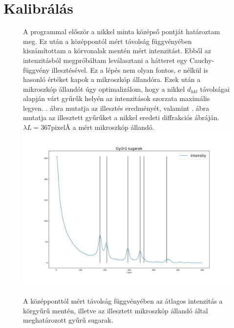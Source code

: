 \documentclass[pdftex,12pt,a4paper]{article}
\begin{document}
	\section{Kalibrálás}
		\begin{figure}[H]
			\centering
			A programmal először a nikkel minta középső pontját határoztam meg. Ez után a középpontól mért távolság függvényében kiszámítottam a körvonalak mentén mért intenzitást. Ebből az intenzitásból megpróbáltam leválasztani a hátteret egy Cauchy-függvény illesztésével. Ez a lépés nem olyan fontos, e nélkül is hasonló értéket kapok a mikroszkóp állandóra. Ezek után a mikroszkóp állandót úgy optimalizálom, hogy a nikkel $d_{hkl}$ távolságai alapján várt gyűrűk helyén az intenzitások szorzata maximális legyen. . ábra mutatja az illesztés eredményét, valamint . ábra mutatja az illesztett gyűrűket a nikkel eredeti diffrakciós ábráján. $\lambda L = 367\text{pixel\AA}$ a mért mikroszkóp állandó. 
			\includegraphics[scale=0.4]{sugarak.pdf}
			\caption{A középponttól mért távolság függvényében az átlagos intenzitás a körgyűrű mentén, illetve az illesztett mikroszkóp állandó által meghatározott gyűrű sugarak.}
			\label{sugarak}
		\end{figure}
\end{document}
